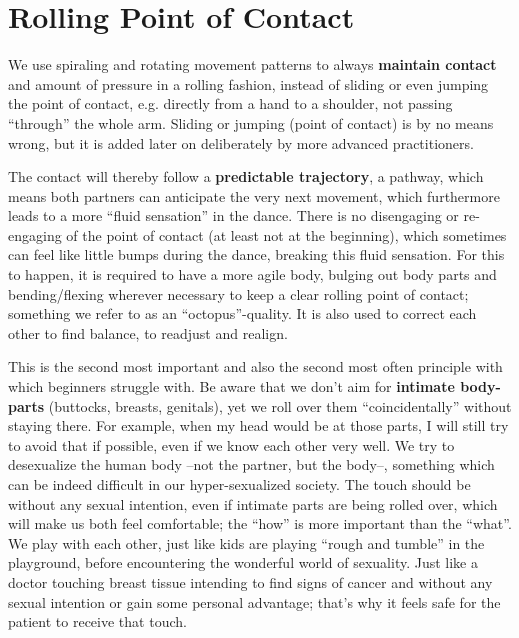 \section{Rolling Point of Contact}\label{sec:rolling-point-of-contact}

We use spiraling and rotating movement patterns to always \textbf{maintain contact} and amount of pressure in a rolling fashion, instead of sliding or even jumping the point of contact, e.g. directly from a hand to a shoulder, not passing ``through'' the whole arm.
Sliding or jumping (point of contact) is by no means wrong, but it is added later on deliberately by more advanced practitioners.

The contact will thereby follow a \textbf{predictable trajectory}, a pathway, which means both partners can anticipate the very next movement, which furthermore leads to a more ``fluid sensation'' in the dance.
There is no disengaging or re-engaging of the point of contact (at least not at the beginning), which sometimes can feel like little bumps during the dance, breaking this fluid sensation.
For this to happen, it is required to have a more agile body, bulging out body parts and bending/flexing wherever necessary to keep a clear rolling point of contact; something we refer to as an ``octopus''-quality.
It is also used to correct each other to find balance, to readjust and realign.

This is the second most important and also the second most often principle with which beginners struggle with.
Be aware that we don't aim for \textbf{intimate body-parts} (buttocks, breasts, genitals), yet we roll over them ``coincidentally'' without staying there.
For example, when my head would be at those parts, I will still try to avoid that if possible, even if we know each other very well.
We try to desexualize the human body --not the partner, but the body--, something which can be indeed difficult in our hyper-sexualized society.
The touch should be without any sexual intention, even if intimate parts are being rolled over, which will make us both feel comfortable; the ``how'' is more important than the ``what''.
We play with each other, just like kids are playing ``rough and tumble'' in the playground, before encountering the wonderful world of sexuality.
Just like a doctor touching breast tissue intending to find signs of cancer and without any sexual intention or gain some personal advantage; that's why it feels safe for the patient to receive that touch.
